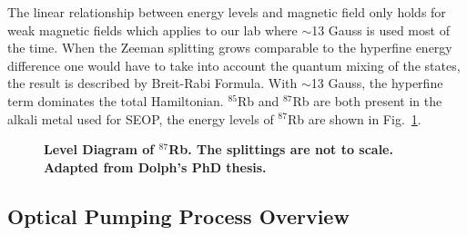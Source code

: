 The linear relationship between energy levels and magnetic field only holds for weak magnetic fields which applies to our lab where $\sim$13 Gauss is used most of the time. When the Zeeman splitting grows comparable to the hyperfine energy difference one would have to take into account the quantum mixing of the states, the result is described by Breit-Rabi Formula. With $\sim$13 Gauss, the hyperfine term dominates the total Hamiltonian. $^{85}$Rb and $^{87}$Rb are both present in the alkali metal used for SEOP, the energy levels of $^{87}$Rb are shown in Fig.~\ref{RbEnergyLevels}.

\begin{figure}[t!]
	\centering
	\caption{{\bf Level Diagram of $^{87}$Rb. The splittings are not to scale. Adapted from Dolph's PhD thesis.}}
	\label{RbEnergyLevels}
\end{figure}

\subsection{Optical Pumping Process Overview}

